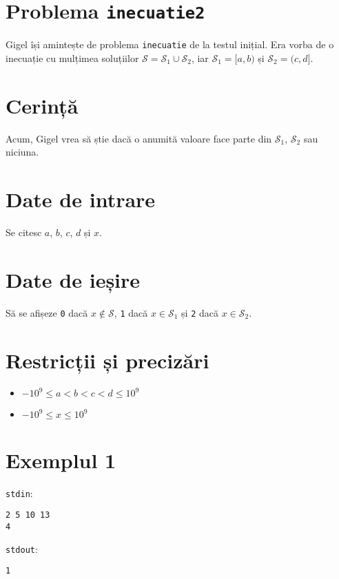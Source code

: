 \documentclass{scrartcl}
\author{Test Tutors of CNMB Informatică}
\date{17 februarie 2024}
\begin{document}
\section*{Problema \texttt{inecuatie2}}
Gigel își amintește de problema \texttt{inecuatie} de la testul inițial. Era vorba de o
inecuație cu mulțimea soluțiilor $\mathcal{S} = \mathcal{S}_1 \cup \mathcal{S}_2$, iar
$\mathcal{S}_1 = [a, b)$ și $\mathcal{S}_2 = (c, d]$.
\section*{Cerință}
Acum, Gigel vrea să știe dacă o anumită valoare face parte din $\mathcal{S}_1$, $\mathcal{S}_2$ sau niciuna.
\section*{Date de intrare}
Se citesc $a$, $b$, $c$, $d$ și $x$. 
\section*{Date de ieșire}
Să se afișeze \texttt{0} dacă $x \notin \mathcal{S}$, \texttt{1} dacă $x \in \mathcal{S}_1$ și \texttt{2} dacă $x \in \mathcal{S}_2$.

\section*{Restricții și precizări}
\begin{itemize}
    \item $-10^9 \leq a < b < c < d \leq 10^9$
    \item $-10^9 \leq x \leq 10^9$

\end{itemize}

{
\parindent0pt
    
\section*{Exemplul 1}
\texttt{stdin}:
    \begin{lstlisting}
2 5 10 13 
4
    \end{lstlisting}

\texttt{stdout}:
    \begin{lstlisting}
1
    \end{lstlisting}

}
\end{document}
